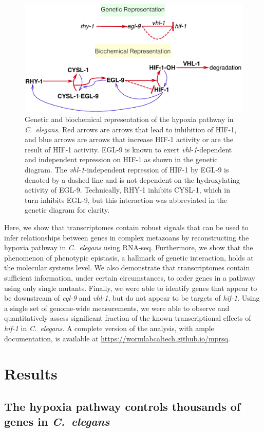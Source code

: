 \documentclass[10pt, onecolumn]{article}
\newcommand{\cel}{\emph{C.~elegans}}
\newcommand{\gene}[1]{\emph{#1}}
\newcommand{\eglp}{EGL-9}
\newcommand{\hifp}{HIF-1}
\begin{document}
\begin{figure}[tbhp]
\centering
\includegraphics[width=.7\linewidth]{../figs/HIF1pathway.pdf}
\caption{
Genetic and biochemical representation of the hypoxia pathway in \cel{}.
Red arrows are arrows that lead to inhibition of \hifp{}, and blue arrows
are arrows that increase \hifp{} activity or are the result of \hifp{} activity.
\eglp{} is known to exert \gene{vhl-1}-dependent and independent repression
on \hifp{} as shown in the genetic diagram. The \gene{vhl-1}-independent
repression of \hifp{} by \eglp{} is denoted by a dashed line and is not dependent
on the hydroxylating activity of \eglp{}.
Technically, RHY-1 inhibits CYSL-1, which in turn inhibits EGL-9, but this
interaction was abbreviated in the genetic diagram for clarity.
}
\label{fig:pathway}
\end{figure}

Here, we show that transcriptomes contain robust signals that can be
used to infer relationships between genes in complex metazoans by reconstructing
the hypoxia pathway in \cel{} using RNA-seq.
Furthermore, we show that the phenomenon of phenotypic epistasis, a hallmark of
genetic interaction, holds at the molecular systems level.
We also demonstrate that transcriptomes contain sufficient information, under
certain circumstances, to order genes in a pathway using only single mutants.
Finally, we were able to identify genes that appear to be downstream of \gene{egl-9}
and \gene{vhl-1}, but do not appear to be targets of \gene{hif-1}.
Using a single set of genome-wide measurements, we were able to observe and
quantitatively assess  significant fraction of the known transcriptional
effects of \gene{hif-1} in \cel{}.
A complete version of the analysis, with ample documentation, is available at
\url{https://wormlabcaltech.github.io/mprsq}.

\section*{Results}
\subsection*{The hypoxia pathway controls thousands of genes in \cel{}}
\label{sub:summary}
\end{document}
